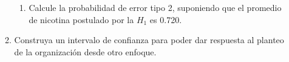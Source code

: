 \documentclass[12pt,letterpaper,fleqn]{article}
\begin{document}
\begin{enumerate}[label=\textbf{\arabic*.}]
\begin{enumerate}[label=\textbf{\alph*.}]
\begin{enumerate}[label=\textbf{\arabic*.}]
                    \item Calcule la probabilidad de error tipo 2, suponiendo que el promedio de nicotina postulado por la $H_1$ es 0.720.

                \end{enumerate}

            \item Construya un intervalo de confianza para poder dar respuesta al planteo de la organización desde otro enfoque.

        \end{enumerate}

    \end{enumerate}
\end{document}
